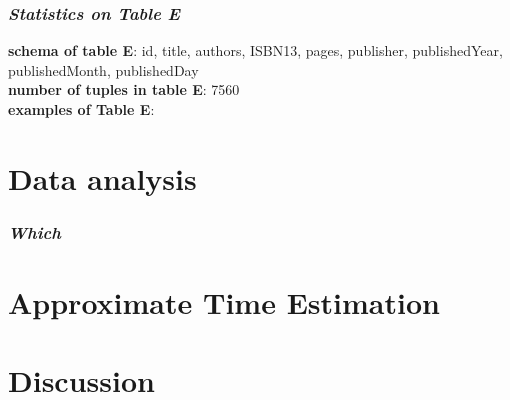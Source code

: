 \documentclass[10pt, oneside]{article}
\begin{document}
\subsubsection*{\textit{Statistics on Table E}}
\textbf{schema of table E}: {id, title,	authors, ISBN13,	pages,	publisher,	publishedYear,  publishedMonth, publishedDay}\\
\textbf{number of tuples in table E}: 7560\\
\textbf{examples of Table E}:\\

\section*{Data analysis}
\subsubsection*{\textit{Which }}




\section*{Approximate Time Estimation}

\section*{Discussion}
\end{document}
